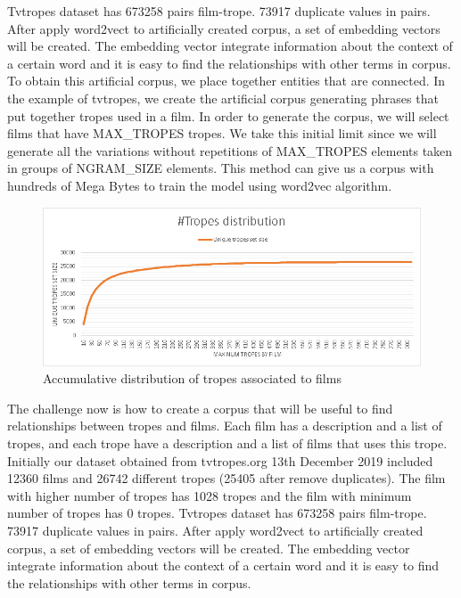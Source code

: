 \documentclass[letterpaper]{article}
\begin{document}
	
	Tvtropes dataset has 673258 pairs film-trope. 73917 duplicate values in pairs. After apply word2vect to artificially created corpus, a set of embedding vectors will be created. The embedding vector integrate information about the context of a certain word and it is easy to find the relationships with other terms in corpus.\\
	To obtain this artificial corpus, we place together entities that are connected. In the example of tvtropes, we create the artificial corpus generating phrases that put together tropes used in a film. In order to generate the corpus, we will select films that have MAX\_TROPES tropes. We take this initial limit since we will generate all the variations without repetitions of MAX\_TROPES elements taken in groups of NGRAM\_SIZE elements. This method can give us a corpus with hundreds of Mega Bytes to train the model using word2vec algorithm. \\
	
	\begin{figure}
		\centering
		\includegraphics[width=1\linewidth]{../images/tropes_distribution_chart.png}
		\caption{Accumulative distribution of tropes associated to films}
		\label{fig:tropesdistributionasociatedtofilms}
	\end{figure}
	
	The challenge now is how to create a corpus that will be useful to find relationships between tropes and films. Each film has a description and a list of tropes, and each trope have a description and a list of films that uses this trope. Initially our dataset obtained from tvtropes.org 13th December 2019 included 12360 films and 26742 different tropes (25405 after remove duplicates). The film with higher number of tropes has 1028 tropes and the film with minimum number of tropes has 0 tropes. Tvtropes dataset has 673258 pairs film-trope. 73917 duplicate values in pairs. After apply word2vect to artificially created corpus, a set of embedding vectors will be created. The embedding vector integrate information about the context of a certain word and it is easy to find the relationships with other terms in corpus.\\
	
\end{document}
